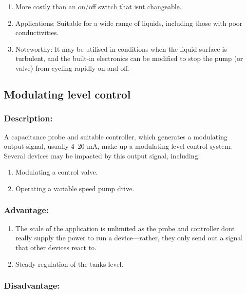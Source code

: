 \begin{enumerate}
\item
  More costly than an on/off switch that isn\textquotesingle t
  changeable.
\item
  Applications: Suitable for a wide range of liquids, including those
  with poor conductivities.
\item
Noteworthy:  It may be utilised in conditions when the liquid surface is turbulent,
and the built-in electronics can be modified to stop the pump (or
valve) from cycling rapidly on and off.
\end{enumerate}



\subsection{Modulating level control}

\subsubsection{Description:}

A capacitance probe and suitable controller, which generates a
modulating output signal, usually 4--20 mA, make up a modulating level
control system. Several devices may be impacted by this output signal, including:

\begin{enumerate}
\item
  Modulating a control valve.
\item
  Operating a variable speed pump drive.
\end{enumerate}

\subsubsection{Advantage:}

\begin{enumerate}
\item
  The scale of the application is unlimited as the probe and controller
  don\textquotesingle t really supply the power to run a
  device---rather, they only send out a signal that other devices react
  to.
\item
Steady regulation of the tank\textquotesingle s level.
\end{enumerate}

\subsubsection{Disadvantage:}

